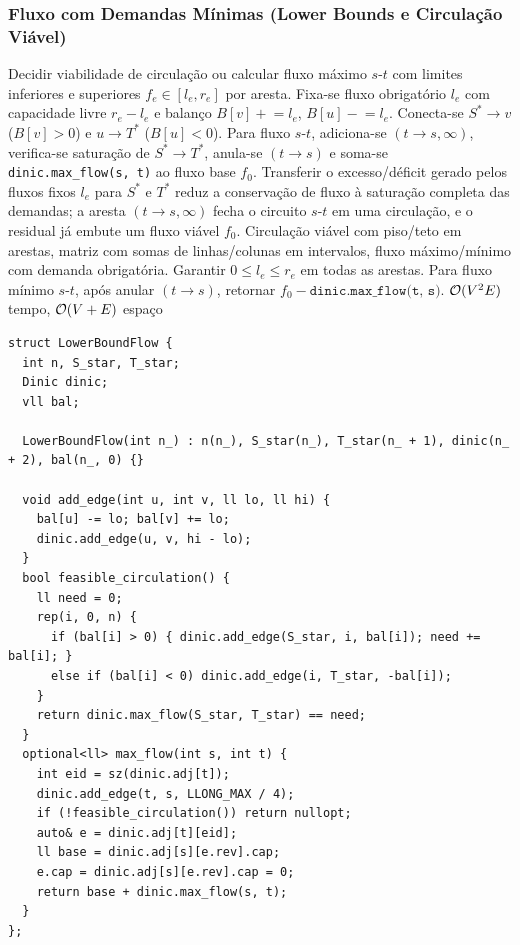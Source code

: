 \subsubsection{Fluxo com Demandas Mínimas (Lower Bounds e Circulação Viável)}
\algobox
  {Decidir viabilidade de circulação ou calcular fluxo máximo $s$-$t$ com limites inferiores e superiores $f_e \in [l_e, r_e]$ por aresta.}
  {Fixa-se fluxo obrigatório $l_e$ com capacidade livre $r_e - l_e$ e balanço $B[v] \mathrel{+}= l_e$, $B[u] \mathrel{-}= l_e$. Conecta-se $S^* \to v$ ($B[v] > 0$) e $u \to T^*$ ($B[u] < 0$). Para fluxo $s$-$t$, adiciona-se $(t \to s, \infty)$, verifica-se saturação de $S^* \to T^*$, anula-se $(t \to s)$ e soma-se \texttt{dinic.max\_flow(s, t)} ao fluxo base $f_0$.}
  {Transferir o excesso/déficit gerado pelos fluxos fixos $l_e$ para $S^*$ e $T^*$ reduz a conservação de fluxo à saturação completa das demandas; a aresta $(t \to s, \infty)$ fecha o circuito $s$-$t$ em uma circulação, e o residual já embute um fluxo viável $f_0$.}
  {Circulação viável com piso/teto em arestas, matriz com somas de linhas/colunas em intervalos, fluxo máximo/mínimo com demanda obrigatória.}
  {Garantir $0 \le l_e \le r_e$ em todas as arestas. Para fluxo mínimo $s$-$t$, após anular $(t \to s)$, retornar $f_0 - \texttt{dinic.max\_flow(t, s)}$.}
  {$\mathcal{O}(V^2 E)$ tempo, $\mathcal{O}(V + E)$ espaço}

\begin{lstlisting}
struct LowerBoundFlow {
  int n, S_star, T_star;
  Dinic dinic;
  vll bal;

  LowerBoundFlow(int n_) : n(n_), S_star(n_), T_star(n_ + 1), dinic(n_ + 2), bal(n_, 0) {}

  void add_edge(int u, int v, ll lo, ll hi) {
    bal[u] -= lo; bal[v] += lo;
    dinic.add_edge(u, v, hi - lo);
  }
  bool feasible_circulation() {
    ll need = 0;
    rep(i, 0, n) {
      if (bal[i] > 0) { dinic.add_edge(S_star, i, bal[i]); need += bal[i]; }
      else if (bal[i] < 0) dinic.add_edge(i, T_star, -bal[i]);
    }
    return dinic.max_flow(S_star, T_star) == need;
  }
  optional<ll> max_flow(int s, int t) {
    int eid = sz(dinic.adj[t]);
    dinic.add_edge(t, s, LLONG_MAX / 4);
    if (!feasible_circulation()) return nullopt;
    auto& e = dinic.adj[t][eid];
    ll base = dinic.adj[s][e.rev].cap;
    e.cap = dinic.adj[s][e.rev].cap = 0;
    return base + dinic.max_flow(s, t);
  }
};
\end{lstlisting}

